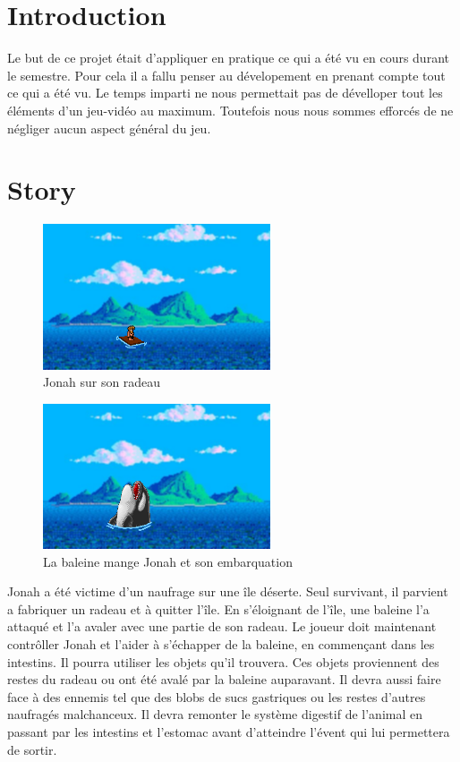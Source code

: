 \documentclass{prologArticle}
\begin{document}
\buildtitle



\section{Introduction}
Le but de ce projet était d'appliquer en pratique ce qui a été vu en cours durant le semestre. Pour cela il a fallu penser au dévelopement en prenant compte tout ce qui a été vu. Le temps imparti ne nous permettait pas de dévelloper tout les éléments d'un jeu-vidéo au maximum. Toutefois nous nous sommes efforcés de ne négliger aucun aspect général du jeu.

\section{Story}

\begin{figure}[H]
    \centering
    \includegraphics[width=0.6\textwidth]{res/story1.png}
    \caption{Jonah sur son radeau}
\end{figure}

\begin{figure}[H]
    \centering
    \includegraphics[width=0.6\textwidth]{res/story2.png}
    \caption{La baleine mange Jonah et son embarquation}
\end{figure}

Jonah a été victime d'un naufrage sur une île déserte. Seul survivant, il parvient a fabriquer un radeau et à quitter l'île. En s'éloignant de l'île, une baleine l'a attaqué et l'a avaler avec une partie de son radeau. Le joueur doit maintenant contrôller Jonah et l'aider à s'échapper de la baleine, en commençant dans les intestins. Il pourra utiliser les objets qu'il trouvera. Ces objets proviennent des restes du radeau ou ont été avalé par la baleine auparavant. Il devra aussi faire face à des ennemis tel que des blobs de sucs gastriques ou les restes d'autres naufragés malchanceux. Il devra remonter le système digestif de l'animal en passant par les intestins et l'estomac avant d'atteindre l'évent qui lui permettera de sortir.
\end{document}
